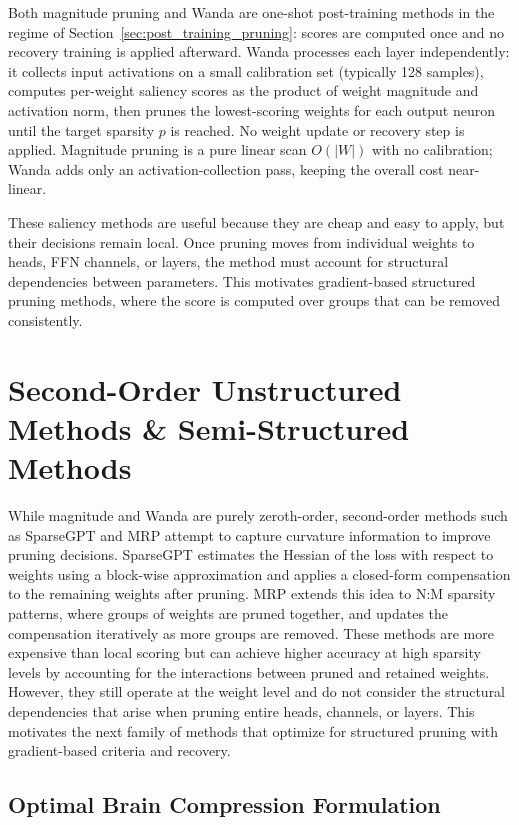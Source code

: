 Both magnitude pruning and Wanda are one-shot post-training methods in the regime of Section~\ref{sec:post_training_pruning}: scores are computed once and no recovery training is applied afterward. Wanda processes each layer independently: it collects input activations on a small calibration set (typically 128 samples), computes per-weight saliency scores as the product of weight magnitude and activation norm, then prunes the lowest-scoring weights for each output neuron until the target sparsity $p$ is reached. No weight update or recovery step is applied. Magnitude pruning is a pure linear scan $O(|W|)$ with no calibration; Wanda adds only an activation-collection pass, keeping the overall cost near-linear.

These saliency methods are useful because they are cheap and easy to apply, but their decisions remain local. Once pruning moves from individual weights to heads, FFN channels, or layers, the method must account for structural dependencies between parameters. This motivates gradient-based structured pruning methods, where the score is computed over groups that can be removed consistently.

\methodsep

\section{Second-Order Unstructured Methods \& Semi-Structured Methods}
While magnitude and Wanda are purely zeroth-order, second-order methods such as SparseGPT \cite{frantar2023sparsegpt} and MRP \cite{kwon2022fast} attempt to capture curvature information to improve pruning decisions. SparseGPT estimates the Hessian of the loss with respect to weights using a block-wise approximation and applies a closed-form compensation to the remaining weights after pruning. MRP extends this idea to N:M sparsity patterns, where groups of weights are pruned together, and updates the compensation iteratively as more groups are removed. These methods are more expensive than local scoring but can achieve higher accuracy at high sparsity levels by accounting for the interactions between pruned and retained weights. However, they still operate at the weight level and do not consider the structural dependencies that arise when pruning entire heads, channels, or layers. This motivates the next family of methods that optimize for structured pruning with gradient-based criteria and recovery.

\subsection{Optimal Brain Compression Formulation}

